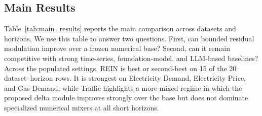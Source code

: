 \documentclass{article}
\newcommand{\method}{REIN\xspace}
\begin{document}
\subsection{Main Results}
\label{sec:main_results}

Table~\ref{tab:main_results} reports the main comparison across datasets and horizons. We use this table to answer two questions. First, can bounded residual modulation improve over a frozen numerical base? Second, can it remain competitive with strong time-series, foundation-model, and LLM-based baselines? Across the populated settings, \method is best or second-best on 15 of the 20 dataset--horizon rows. It is strongest on Electricity Demand, Electricity Price, and Gas Demand, while Traffic highlights a more mixed regime in which the proposed delta module improves strongly over the base but does not dominate specialized numerical mixers at all short horizons.
\end{document}
